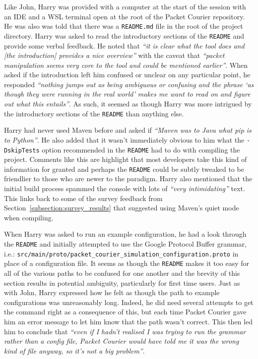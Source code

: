Like John, Harry was provided with a computer at the start of the session with an IDE and a WSL terminal open at the
root of the Packet Courier repository. He was also was told that there was a \texttt{README.md} file in the root of
the project directory. Harry was asked to read the introductory sections of the \texttt{README} and provide some
verbal feedback. He noted that \emph{``it is clear what the tool does and [the introduction] provides a nice
overview''} with the caveat that \emph{``packet manipulation seems very core to the tool and could be mentioned
earlier''}. When asked if the introduction left him confused or unclear on any particular point, he responded
\emph{``nothing jumps out as being ambiguous or confusing and the phrase `as though they were running in the real
world' makes me want to read on and figure out what this entails''}. As such, it seemed as though Harry was more
intrigued by the introductory sections of the \texttt{README} than anything else.

Harry had never used Maven before and asked if \emph{``Maven was to Java what pip\cite{pip} is to Python''}. He also
added that it wasn't immediately obvious to him what the \texttt{-DskipTests} option recommended in the
\texttt{README} had to do with compiling the project. Comments like this are highlight that most developers take this
kind of information for granted and perhaps the \texttt{README} could be subtly tweaked to be friendlier to those who
are newer to the paradigm. Harry also mentioned that the initial build process spammed the console with lots of
\emph{``very intimidating''} text. This links back to some of the survey feedback from
Section~\ref{subsection:survey_results} that suggested using Maven's quiet mode when compiling.

When Harry was asked to run an example configuration, he had a look through the \texttt{README} and initially
attempted to use the Google Protocol Buffer grammar, i.e.:
\texttt{src/main/proto/packet\_courier\_simulation\_configuration.proto} in place of a configuration file. It seems as
though the \texttt{README} makes it too easy for all of the various paths to be confused for one another and the
brevity of this section results in potential ambiguity, particularly for first time users. Just as with John, Harry
expressed how he felt as though the path to example configurations was unreasonably long. Indeed, he did need several
attempts to get the command right as a consequence of this, but each time Packet Courier gave him an error message to
let him know that the path wasn't correct. This then led him to conclude that \emph{``even if I hadn't realised I was
trying to run the grammar rather than a config file, Packet Courier would have told me it was the wrong kind of file
anyway, so it's not a big problem''}.

